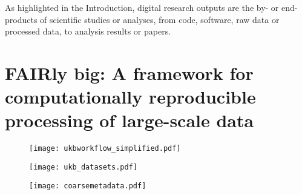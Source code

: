 As highlighted in the Introduction, digital research outputs are the by- or end-products of scientific studies or analyses, from code, software, raw data or processed data, to analysis results or papers.

\pagebreak

\section{FAIRly big: A framework for computationally reproducible processing of large-scale data}



\begin{figure}
	\centering
	\texttt{[image: ukbworkflow\_simplified.pdf]}
	\caption[]{}
	\label{fig:fairly_workflow}
\end{figure}

\begin{figure}
	\centering
	\texttt{[image: ukb\_datasets.pdf]}
	\caption[]{}
	\label{fig:fairly_datasets}
\end{figure}

\begin{figure}
	\centering
	\texttt{[image: coarsemetadata.pdf]}
	\caption[]{}
	\label{fig:fairly_metadata}
\end{figure}



\pagebreak